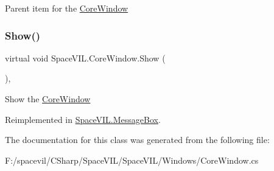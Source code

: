 Parent item for the \mbox{\hyperlink{class_space_v_i_l_1_1_core_window}{Core\+Window}} 

\mbox{\label{class_space_v_i_l_1_1_core_window_a6f25e26e98c54d56d93b0abfc88af3c0}} 
\subsubsection{\texorpdfstring{Show()}{Show()}}
{\footnotesize\ttfamily virtual void Space\+V\+I\+L.\+Core\+Window.\+Show (\begin{DoxyParamCaption}{ }\end{DoxyParamCaption})\hspace{0.3cm}{\ttfamily [inline]}, {\ttfamily [virtual]}}



Show the \mbox{\hyperlink{class_space_v_i_l_1_1_core_window}{Core\+Window}} 



Reimplemented in \mbox{\hyperlink{class_space_v_i_l_1_1_message_box_a2d2963f79fd8eb73c03872eee52b4331}{Space\+V\+I\+L.\+Message\+Box}}.



The documentation for this class was generated from the following file\+:\begin{DoxyCompactItemize}
\item 
F\+:/spacevil/\+C\+Sharp/\+Space\+V\+I\+L/\+Space\+V\+I\+L/\+Windows/Core\+Window.\+cs\end{DoxyCompactItemize}
